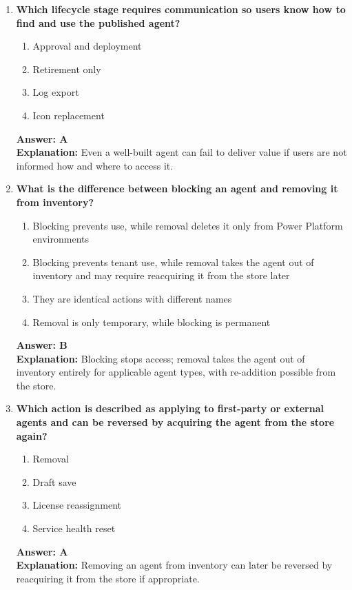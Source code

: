 \documentclass[10pt]{article}
\begin{document}
\begin{enumerate}[leftmargin=*]
\item \textbf{Which lifecycle stage requires communication so users know how to find and use the published agent?}
\begin{enumerate}[label=\Alph*.]
  \item Approval and deployment
  \item Retirement only
  \item Log export
  \item Icon replacement
\end{enumerate}
\textbf{Answer: A}\\
\textbf{Explanation:} Even a well-built agent can fail to deliver value if users are not informed how and where to access it.

\item \textbf{What is the difference between blocking an agent and removing it from inventory?}
\begin{enumerate}[label=\Alph*.]
  \item Blocking prevents use, while removal deletes it only from Power Platform environments
  \item Blocking prevents tenant use, while removal takes the agent out of inventory and may require reacquiring it from the store later
  \item They are identical actions with different names
  \item Removal is only temporary, while blocking is permanent
\end{enumerate}
\textbf{Answer: B}\\
\textbf{Explanation:} Blocking stops access; removal takes the agent out of inventory entirely for applicable agent types, with re-addition possible from the store.

\item \textbf{Which action is described as applying to first-party or external agents and can be reversed by acquiring the agent from the store again?}
\begin{enumerate}[label=\Alph*.]
  \item Removal
  \item Draft save
  \item License reassignment
  \item Service health reset
\end{enumerate}
\textbf{Answer: A}\\
\textbf{Explanation:} Removing an agent from inventory can later be reversed by reacquiring it from the store if appropriate.


\end{enumerate}
\end{document}

